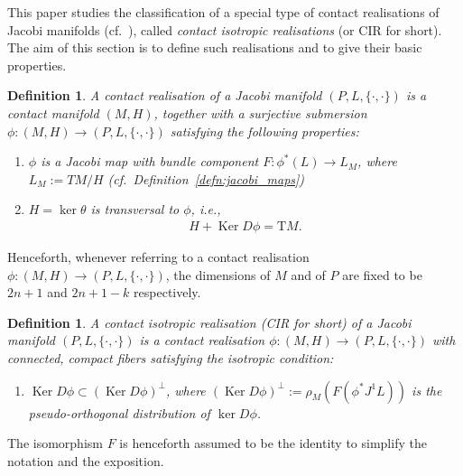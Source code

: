 \documentclass[pdftex]{sigma}
\numberwithin{equation}{section}
\newtheorem{Definition}[Theorem]{Definition}
\newcommand{\Ker}{\operatorname{Ker}} %
\newcommand{\JM}{(P,L,\{\cdot,\cdot\})} %
\newcommand{\CM}{(M,H)} %
\begin{document}
This paper studies the classif\/ication of a special type of contact realisations of Jacobi manifolds (cf.\ \cite[Def\/inition~3.7]{Zambon}), called {\it contact isotropic realisations} (or CIR for short). The aim of this section is to def\/ine such realisations and to give their basic properties.

\begin{Definition}\label{defn:CR}
A {\it contact realisation} of a Jacobi manifold $\JM$ is a contact manifold $\CM$, together with a surjective submersion $\phi\colon \CM \to \JM$ satisfying the following properties:
 \begin{enumerate}[label=(CR\arabic*),ref=(CR\arabic*),leftmargin=*]\itemsep=0pt
 \item \label{item:IR1}$\phi$ is a Jacobi map with bundle component $F\colon \phi^*(L)\to L_M$, where $L_M:= TM/H$ (cf.\ Def\/inition~\ref{defn:jacobi_maps})
 \item \label{item:IR2} $H = \ker \theta$ is transversal to $\phi$, i.e.,
 \begin{gather*}
 H+\Ker D\phi=\mathrm{T}M.
 \end{gather*}
 \end{enumerate}
\end{Definition}

Henceforth, whenever referring to a contact realisation $\phi\colon \CM \to \JM$, the dimensions of $M$ and of $P$ are f\/ixed to be $2n+1$ and $2n+1-k$ respectively.

\begin{Definition}\label{defn:CIR}
A {\it contact isotropic realisation} (CIR for short) of a Jacobi manifold $\JM$ is a contact realisation $\phi\colon \CM\to \JM$ with connected, compact f\/ibers satisfying the isotropic condition:
 \begin{enumerate}[label=(I),ref=(I)]\itemsep=0pt
 \item \label{item:IR3} $\Ker D\phi\subset (\Ker D\phi)^{\perp}$, where $ (\Ker D\phi)^{\perp} := \rho_M(F(\phi^*J^1L))$ is the {\em pseudo-orthogonal distribution} of $\ker D\phi$.
 \end{enumerate}
\end{Definition}

The isomorphism $F$ is henceforth assumed to be the identity to simplify the notation and the exposition.
\end{document}
